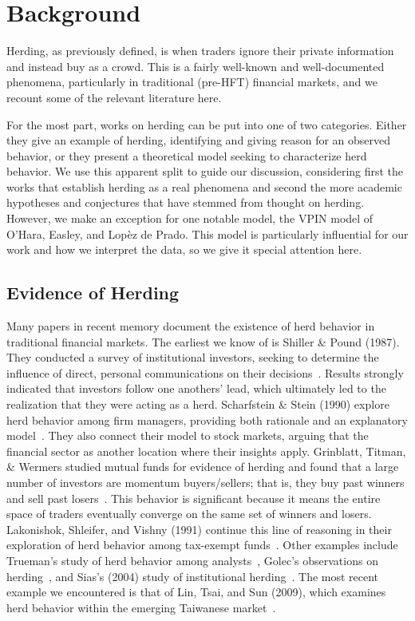 \section{Background}
\label{background}

Herding, as previously defined, is when traders ignore their private information and instead buy as a crowd.
This is a fairly well-known and well-documented phenomena, particularly in traditional (pre-HFT) financial markets, and we recount some of the relevant literature here.

For the most part, works on herding can be put into one of two categories. 
Either they give an example of herding, identifying and giving reason for an observed behavior, or they present a theoretical model seeking to characterize herd behavior.
We use this apparent split to guide our discussion, considering first the works that establish herding as a real phenomena and second the more academic hypotheses and conjectures that have stemmed from thought on herding.
However, we make an exception for one notable model, the VPIN model of O'Hara, Easley, and Lop\`ez de Prado. 
This model is particularly influential for our work and how we interpret the data, so we give it special attention here. 

\subsection{Evidence of Herding}
Many papers in recent memory document the existence of herd behavior in traditional financial markets.
The earliest we know of is Shiller \& Pound (1987).
They conducted a survey of institutional investors, seeking to determine the influence of direct, personal communications on their decisions~\cite{shiller1989survey}.
Results strongly indicated that investors follow one anothers' lead, which ultimately led to the realization that they were acting as a herd.
Scharfstein \& Stein (1990) explore herd behavior among firm managers, providing both rationale and an explanatory model~\cite[3]{scharfstein1990herd}.
They also connect their model to stock markets, arguing that the financial sector as another location where their insights apply.
Grinblatt, Titman, \& Wermers studied mutual funds for evidence of herding and found that a large number of investors are momentum buyers/sellers; that is, they buy past winners and sell past losers~\cite{grinblatt1995momentum}.
This behavior is significant because it means the entire space of traders eventually converge on the same set of winners and losers.
Lakonishok, Shleifer, and Vishny (1991) continue this line of reasoning in their exploration of herd behavior among tax-exempt funds~\cite{lakonishok1992impact}.
Other examples include Trueman's study of herd behavior among analysts~\cite{trueman1994analyst}, Golec's observations on herding~\cite{golec1997herding}, and Sias's (2004) study of institutional herding~\cite{sias2004institutional}.
The most recent example we encountered is that of Lin, Tsai, and Sun (2009), which examines herd behavior within the emerging Taiwanese market~\cite{lin}.

